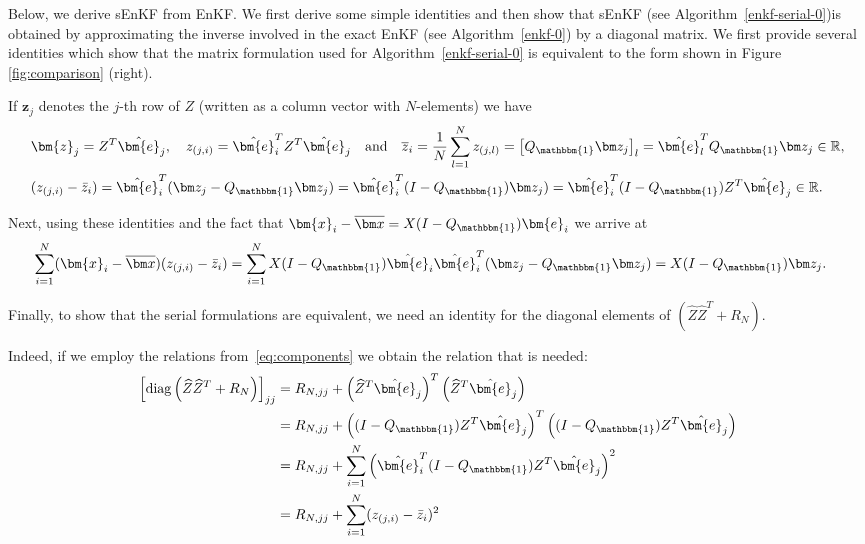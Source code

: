 \documentclass[11p]{elsarticle}
\numberwithin{equation}{section}
\newcommand{\vect}[1]{\ensuremath{\bm{#1}}}
\begin{document}
Below, we derive sEnKF from EnKF. We first derive some simple identities and then show that sEnKF (see Algorithm~\ref{enkf-serial-0})is obtained by approximating the inverse involved in the exact EnKF (see Algorithm~\ref{enkf-0})  by a diagonal matrix. 
We first provide several identities  which show that the matrix formulation used for Algorithm~\ref{enkf-serial-0}  is equivalent to the form shown in Figure \ref{fig:comparison} (right).

If $\bm{z}_j$ denotes the $j$-th row of $Z$ (written as a column vector with $N$-elements) we have
\begin{equation}\label{eq:components}
\begin{aligned}
&\bm{z}_j=Z^T\hat{\vect{e}}_j,\quad
z_{(j,i)}=\hat{\vect{e}}_i^TZ^T\hat{\vect{e}}_j\quad\mbox{and}\quad 
\overline{z}_i=
\frac{1}{N}\sum_{l=1}^N z_{(j,l)} =
\left[Q_{\mathbbm{1}}\bm z_j\right]_l=
\hat{\vect{e}}_l^TQ_{\mathbbm{1}}\bm z_j\in \mathbb{R},\\
&(z_{(j,i)} - \bar{z}_{i})=\hat{\vect{e}}_i^T(\bm z_{j} - Q_{\mathbbm{1}}\bm z_{j})
=\hat{\vect{e}}_i^T(I - Q_{\mathbbm{1}})
\bm z_{j})=\hat{\vect{e}}_i^T(I - Q_{\mathbbm{1}})Z^T\hat{\vect{e}}_{j}\in \mathbb{R}.
\end{aligned}
\end{equation}


Next, using these identities and 
the fact that 
\(\bm{x}_{i} - \overline{\bm x}=X(I-Q_{\mathbbm{1}})\bm{e}_i\) we arrive at 
\begin{equation*}
\begin{aligned}
\sum_{i=1}^N
(\bm{x}_{i} - \overline{\bm x})(z_{(j,i)} - \bar{z}_{i})
&=
\sum_{i=1}^NX(I-Q_{\mathbbm{1}})\hat{\vect{e}}_i\hat{\vect{e}}_i^T(\bm z_{j} - Q_{\mathbbm{1}}\bm z_{j})
=X(I-Q_{\mathbbm{1}})\bm z_{j}.
\end{aligned}
\end{equation*}



Finally, to show that the serial formulations are equivalent, we need an identity for the diagonal elements of \((\widehat{Z}\widehat{Z}^T+R_N)\).

Indeed, if we employ the relations from~\eqref{eq:components} we obtain the relation that is needed:
 \begin{equation}\label{indentity-diag}
 \begin{aligned}
\left[ \operatorname{diag}
\left(\widehat{Z}\widehat{Z}^T+R_N\right)\right]_{jj}
&=
R_{N,jj}+\left(\widehat{Z}^T\hat{\vect{e}}_j\right)^T\left(\widehat{Z}^T\hat{\vect{e}}_j\right)\\
&=
R_{N,jj}+\left((I-Q_{\mathbbm{1}})Z^T\hat{\vect{e}}_j\right)^T\left((I-Q_{\mathbbm{1}})Z^T\hat{\vect{e}}_j\right)\\
&=
R_{N,jj}+\sum_{i=1}^N\left(\hat{\vect{e}}_i^T(I-Q_{\mathbbm{1}})Z^T\hat{\vect{e}}_j\right)^2\\
&=R_{N,{jj}}+\sum_{i=1}^{N} (z_{(j,i)} - \bar{z}_{{i}})^2
\end{aligned}     
\end{equation}
\end{document}
